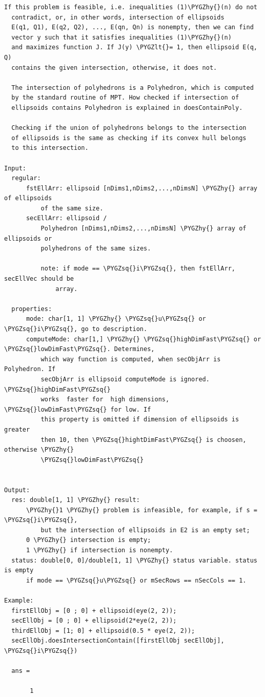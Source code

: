 \documentclass[letterpaper,10pt,english]{sphinxmanual}
\def\PYGZlt{\char`\<}
\def\PYGZhy{\char`\-}
\def\PYGZsq{\char`\'}
\begin{document}
\begin{Verbatim}[commandchars=\\\{\}]
  If this problem is feasible, i.e. inequalities (1)\PYGZhy{}(n) do not
  contradict, or, in other words, intersection of ellipsoids
  E(q1, Q1), E(q2, Q2), ..., E(qn, Qn) is nonempty, then we can find
  vector y such that it satisfies inequalities (1)\PYGZhy{}(n)
  and maximizes function J. If J(y) \PYGZlt{}= 1, then ellipsoid E(q, Q)
  contains the given intersection, otherwise, it does not.

  The intersection of polyhedrons is a Polyhedron, which is computed
  by the standard routine of MPT. How checked if intersection of
  ellipsoids contains Polyhedron is explained in doesContainPoly.

  Checking if the union of polyhedrons belongs to the intersection
  of ellipsoids is the same as checking if its convex hull belongs
  to this intersection.

Input:
  regular:
      fstEllArr: ellipsoid [nDims1,nDims2,...,nDimsN] \PYGZhy{} array of ellipsoids
          of the same size.
      secEllArr: ellipsoid /
          Polyhedron [nDims1,nDims2,...,nDimsN] \PYGZhy{} array of ellipsoids or
          polyhedrons of the same sizes.

          note: if mode == \PYGZsq{}i\PYGZsq{}, then fstEllArr, secEllVec should be
              array.

  properties:
      mode: char[1, 1] \PYGZhy{} \PYGZsq{}u\PYGZsq{} or \PYGZsq{}i\PYGZsq{}, go to description.
      computeMode: char[1,] \PYGZhy{} \PYGZsq{}highDimFast\PYGZsq{} or \PYGZsq{}lowDimFast\PYGZsq{}. Determines,
          which way function is computed, when secObjArr is Polyhedron. If
          secObjArr is ellipsoid computeMode is ignored. \PYGZsq{}highDimFast\PYGZsq{}
          works  faster for  high dimensions, \PYGZsq{}lowDimFast\PYGZsq{} for low. If
          this property is omitted if dimension of ellipsoids is greater
          then 10, then \PYGZsq{}hightDimFast\PYGZsq{} is choosen, otherwise \PYGZhy{}
          \PYGZsq{}lowDimFast\PYGZsq{}


Output:
  res: double[1, 1] \PYGZhy{} result:
      \PYGZhy{}1 \PYGZhy{} problem is infeasible, for example, if s = \PYGZsq{}i\PYGZsq{},
          but the intersection of ellipsoids in E2 is an empty set;
      0 \PYGZhy{} intersection is empty;
      1 \PYGZhy{} if intersection is nonempty.
  status: double[0, 0]/double[1, 1] \PYGZhy{} status variable. status is empty
      if mode == \PYGZsq{}u\PYGZsq{} or mSecRows == nSecCols == 1.

Example:
  firstEllObj = [0 ; 0] + ellipsoid(eye(2, 2));
  secEllObj = [0 ; 0] + ellipsoid(2*eye(2, 2));
  thirdEllObj = [1; 0] + ellipsoid(0.5 * eye(2, 2));
  secEllObj.doesIntersectionContain([firstEllObj secEllObj], \PYGZsq{}i\PYGZsq{})

  ans =

       1
\end{Verbatim}
\end{document}
